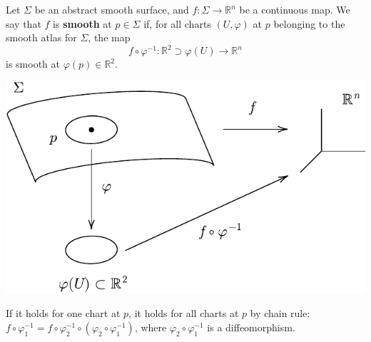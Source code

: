 \documentclass[a4paper,11pt]{article}
\begin{document}
\begin{definition}
	Let \( \Sigma \) be an abstract smooth surface, and \( f \colon \Sigma \to \mathbb R^n \) be a continuous map.
	We say that \( f \) is \textbf{smooth} at \( p \in \Sigma \) if, for all charts \( (U, \varphi) \) at \( p \) belonging to the smooth atlas for \( \Sigma \), the map
	\[
		f \circ \varphi^{-1} \colon \mathbb{R}^{2}\supset \varphi(U) \to \mathbb R^n
	\]
	is smooth at \( \varphi(p) \in \mathbb R^2 \).
\end{definition}

\begin{center}
	\includegraphics[scale=0.8]{SmoothFunction}
\end{center}

\begin{note}
	If it holds for one chart at $p$, it holds for all charts at $p$ by chain rule: $ f\circ \varphi_1^{-1} = f\circ \varphi_2^{-1} \circ (\varphi_2\circ \varphi_1^{-1}) $, where $ \varphi_2\circ \varphi_1^{-1} $ is a diffeomorphism. 
\end{note}
\end{document}
